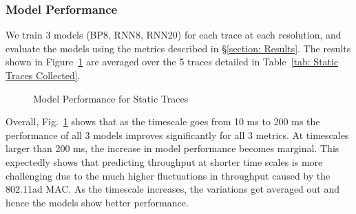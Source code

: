 \documentclass[sigconf,anonymous]{acmart}
\begin{document}
\subsubsection{Model Performance}
\label{subsubsection: Model Performance}

We train 3 models (BP8, RNN8, RNN20) for each trace at each resolution, and evaluate the models using the metrics described in \S \ref{section: Results}. The results shown in Figure~\ref{Static Conditions} are averaged over the 5 traces detailed in Table~\ref{tab: Static Traces Collected}.

\begin{figure}[h]
\centering
{}
\hfill
{}
\hfill
{}
\caption{Model Performance for Static Traces}
\label{Static Conditions}
\end{figure}

Overall, Fig.~\ref{Static Conditions} shows that as the timescale goes from 10 ms to 200 ms the performance of all 3 models improves significantly for all 3 metrics. At timescales larger than 200 ms, the increase in model performance becomes marginal. This expectedly shows that predicting throughput at shorter time scales is more challenging due to the much higher fluctuations in throughput caused by the 802.11ad MAC. As the timescale increases, the variations get averaged out and hence the models show better performance.
\end{document}
